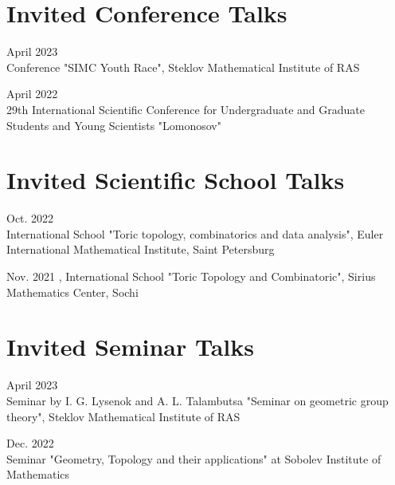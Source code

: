 \documentclass[11pt,letterpaper]{report}
\begin{document}
    
    
     \section*{Invited Conference Talks}

    \begin{tablist}
       \item{April 2023} \\ Conference "SIMC Youth Race", Steklov Mathematical Institute of RAS
       
       \item{April 2022} \\ 29th International Scientific Conference for Undergraduate and Graduate Students and Young Scientists "Lomonosov"
          
    \end{tablist}
    
    
    
    
    \section*{Invited Scientific School Talks}
    
    \begin{tablist}
    
    \item{Oct. 2022} \\ International School "Toric topology, combinatorics and data analysis", Euler International Mathematical Institute, Saint Petersburg
    
    \item{Nov. 2021} , International School
"Toric Topology and Combinatoric", Sirius Mathematics Center, Sochi
    
    \end{tablist}
    
    
    
      \section*{Invited Seminar Talks}
      
      \begin{tablist}
       \item{April 2023} \\ Seminar by I. G. Lysenok and A. L. Talambutsa "Seminar on geometric group theory", Steklov Mathematical Institute of RAS
       
       \item{Dec. 2022} \\ Seminar "Geometry, Topology and their applications" at Sobolev Institute of Mathematics
       
      
    \end{tablist}
    
\end{document}
